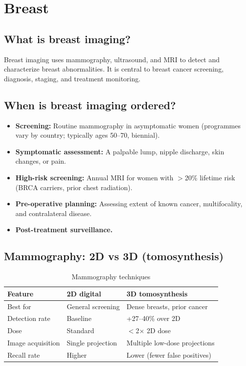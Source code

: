 \chapter{Breast}

\label{ch:ch53_breast}

\section{What is breast imaging?}
Breast imaging uses mammography, ultrasound, and MRI to detect and characterize breast abnormalities. It is central to breast cancer screening, diagnosis, staging, and treatment monitoring.

\section{When is breast imaging ordered?}
\begin{itemize}
    \item \textbf{Screening:} Routine mammography in asymptomatic women (programmes vary by country; typically ages 50--70, biennial).
    \item \textbf{Symptomatic assessment:} A palpable lump, nipple discharge, skin changes, or pain.
    \item \textbf{High-risk screening:} Annual MRI for women with $>$20\% lifetime risk (BRCA carriers, prior chest radiation).
    \item \textbf{Pre-operative planning:} Assessing extent of known cancer, multifocality, and contralateral disease.
    \item \textbf{Post-treatment surveillance.}
\end{itemize}

\section{Mammography: 2D vs 3D (tomosynthesis)}

\begin{table}[h]
\centering
\caption{Mammography techniques}
\label{tab:mammo_techniques}
\begin{tabular}{@{}p{}p{}p{}@{}}
\hline
\textbf{Feature} & \textbf{2D digital} & \textbf{3D tomosynthesis} \\
\hline
Best for & General screening & Dense breasts, prior cancer \\
Detection rate & Baseline & +27--40\% over 2D \\
Dose & Standard & $<$2$\times$ 2D dose \\
Image acquisition & Single projection & Multiple low-dose projections \\
Recall rate & Higher & Lower (fewer false positives) \\
\hline
\end{tabular}
\end{table}

